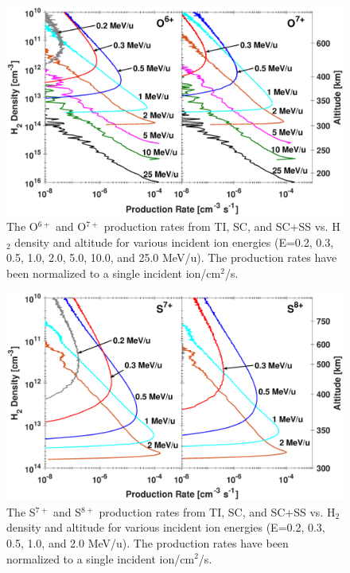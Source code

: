 \documentclass[draft]{agujournal2018}
\begin{document}
\begin{figure}
    \centering
    \includegraphics[width=\textwidth]{Figures/O6O7CXProd.eps}
    \caption{The O$^{6+}$ and O$^{7+}$ production rates from TI, SC, and SC+SS vs. H$_2$ density and altitude for various incident ion energies (E=0.2, 0.3, 0.5, 1.0, 2.0, 5.0, 10.0, and 25.0 MeV/u). The production rates have been normalized to a single incident ion/cm$^2$/s.}
    \label{fig:O6O7+Prod}
\end{figure}

\begin{figure}
    \centering
    \includegraphics[width=\textwidth]{Figures/S7S8CXProd.eps}
    \caption{The S$^{7+}$ and S$^{8+}$ production rates from TI, SC, and SC+SS vs. H$_2$ density and altitude for various incident ion energies (E=0.2, 0.3, 0.5, 1.0, and 2.0 MeV/u). The production rates have been normalized to a single incident ion/cm$^2$/s.}
    \label{fig:S7S8+Prod}
\end{figure}
\end{document}
